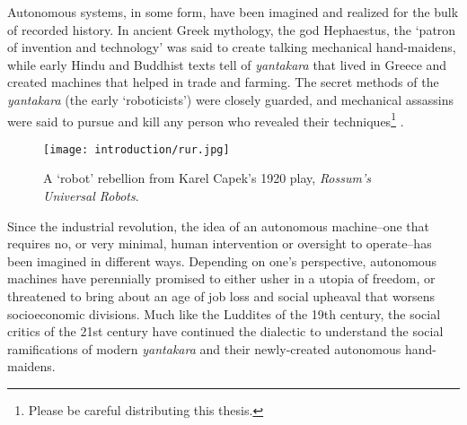Autonomous systems, in some form, have been imagined and realized for the bulk of recorded history. In ancient Greek mythology, the god Hephaestus, the `patron of invention and technology' \citep{MayorGodsRobots2019} was said to create talking mechanical hand-maidens, while early Hindu and Buddhist texts tell of \textit{yantakara} that lived in Greece and created machines that helped in trade and farming. The secret methods of the \textit{yantakara} (the early `roboticists') were closely guarded, and mechanical assassins were said to pursue and kill any person who revealed their techniques\footnote{Please be careful distributing this thesis.} \citep{MayorGodsRobots2019}.
 

\begin{wrapfigure}{r}{0.5\textwidth}
  \begin{center}
  	\vspace{-20pt}
    \texttt{[image: introduction/rur.jpg]}
     \vspace{-15pt}
  \end{center}
  \caption{A `robot' rebellion from Karel Capek's 1920 play, \textit{Rossum's Universal Robots}.}
  \vspace{-5pt}
  \label{fig:into_rur}
\end{wrapfigure}

Since the industrial revolution, the idea of an autonomous machine--one that requires no, or very minimal, human intervention or oversight to operate--has been imagined in different ways. Depending on one's perspective, autonomous machines have perennially promised to either usher in a utopia of freedom, or threatened to bring about an age of job loss and social upheaval that worsens socioeconomic divisions. Much like the Luddites of the 19th century, the social critics of the 21st century have continued the dialectic to understand the social ramifications of modern \textit{yantakara} and their newly-created autonomous hand-maidens.

